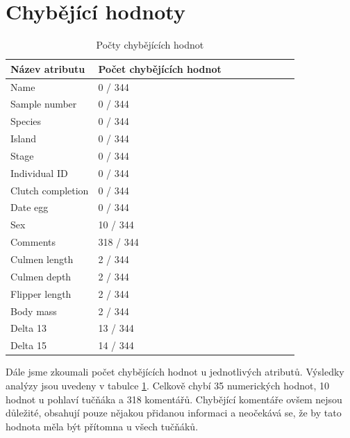 \documentclass[10pt,xcolor=pdflatex,dvipsnames,table,oneside]{book}
\begin{document}
\section{Chybějící hodnoty}
\begin{table}[]
  \centering
  \begin{tabular}{|l|l|l|l|l|l|l|l|l|}
    \hline
    \textbf{Název atributu} & \textbf{Počet chybějících hodnot} \\ \hline
    Name                    & 0 / 344                           \\ \hline
    Sample number           & 0 / 344                           \\ \hline
    Species                 & 0 / 344                           \\ \hline
    Island                  & 0 / 344                           \\ \hline
    Stage                   & 0 / 344                           \\ \hline
    Individual ID           & 0 / 344                           \\ \hline
    Clutch completion       & 0 / 344                           \\ \hline
    Date egg                & 0 / 344                           \\ \hline
    Sex                     & 10 / 344                          \\ \hline
    Comments                & 318 / 344                         \\ \hline
    Culmen length           & 2 / 344                           \\ \hline
    Culmen depth            & 2 / 344                           \\ \hline
    Flipper length          & 2 / 344                           \\ \hline
    Body mass               & 2 / 344                           \\ \hline
    Delta 13                & 13 / 344                          \\ \hline
    Delta 15                & 14 / 344                          \\ \hline
  \end{tabular}
  \caption{Počty chybějících hodnot}
  \label{tab:missing}
\end{table}

Dále jsme zkoumali počet chybějících hodnot u jednotlivých atributů. Výsledky analýzy jsou uvedeny v tabulce \ref{tab:missing}.
Celkově chybí 35 numerických hodnot, 10 hodnot u pohlaví tučňáka a 318 komentářů. Chybějící komentáře ovšem nejsou důležité, obsahují pouze nějakou přidanou informaci a neočekává se, že by tato hodnota měla být přítomna u všech tučňáků.
\end{document}
